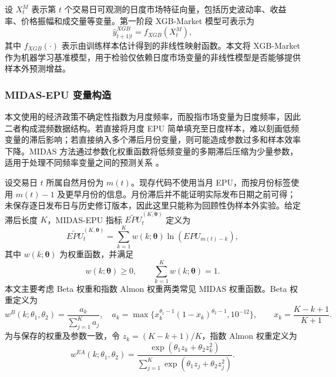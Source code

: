 设 \(X_t^M\) 表示第 \(t\) 个交易日可观测的日度市场特征向量，包括历史波动率、收益率、价格振幅和成交量等变量。第一阶段 XGB-Market 模型可表示为
\begin{equation}
	\hat{y}^{XGB}_{t+1|t}
	=
	f_{XGB}(X_t^M),
\end{equation}
其中 \(f_{XGB}(\cdot)\) 表示由训练样本估计得到的非线性映射函数。本文将 XGB-Market 作为机器学习基准模型，用于检验仅依赖日度市场变量的非线性模型是否能够提供样本外预测增益。

\subsubsection{MIDAS-EPU 变量构造}

本文使用的经济政策不确定性指数为月度频率，而股指市场变量为日度频率，因此二者构成混频数据结构。若直接将月度 EPU 简单填充至日度样本，难以刻画低频变量的滞后影响；若直接纳入多个滞后月份变量，则可能造成参数过多和样本效率下降。MIDAS 方法通过参数化权重函数将低频变量的多期滞后压缩为少量参数，适用于处理不同频率变量之间的预测关系 \citep{GhyselsSinkoValkanov2007,EngleGhyselsSohn2013}。

设交易日 \(t\) 所属自然月份为 \(m(t)\)。现存代码不使用当月 EPU，而按月份标签使用 \(m(t)-1\) 及更早月份的信息。月份滞后并不能证明实际发布日期之前可得；未保存逐日发布日与历史修订版本，因此这里只能称为回顾性伪样本外实验。给定滞后长度 \(K\)，MIDAS-EPU 指标 $\widetilde{EPU}_{t}^{(K,\boldsymbol{\theta})}$ 定义为
\begin{equation}
	\widetilde{EPU}_{t}^{(K,\boldsymbol{\theta})}
	=
	\sum_{k=1}^{K}
	w(k;\boldsymbol{\theta})
	\ln(EPU_{m(t)-k}),
\end{equation}
其中 \(w(k;\boldsymbol{\theta})\) 为权重函数，并满足
\begin{equation}
	w(k;\boldsymbol{\theta})\geq0,
	\qquad
	\sum_{k=1}^{K}w(k;\boldsymbol{\theta})=1.
\end{equation}
本文主要考虑 Beta 权重和指数 Almon 权重两类常见 MIDAS 权重函数。Beta 权重定义为
\begin{equation}
	w^{B}(k;\theta_1,\theta_2)
	=
	\frac{a_k}{\sum_{j=1}^{K}a_j},
    \quad a_k=\max\{x_k^{\theta_1-1}(1-x_k)^{\theta_2-1},10^{-12}\},
	\qquad
	x_k=\frac{K-k+1}{K+1}.
\end{equation}
为与保存的权重及参数一致，令 $z_k=(K-k+1)/K$，指数 Almon 权重定义为
\begin{equation}
	w^{EA}(k;\theta_1,\theta_2)
	=
	\frac{
		\exp(\theta_1 z_k+\theta_2 z_k^2)
	}{
		\sum_{j=1}^{K}\exp(\theta_1 z_j+\theta_2 z_j^2)
	}.
\end{equation}

